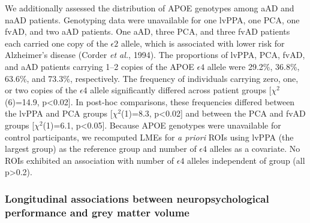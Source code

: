 \documentclass[]{article}
\begin{document}
We additionally assessed the distribution of APOE genotypes among aAD
and naAD patients. Genotyping data were unavailable for one lvPPA, one
PCA, one fvAD, and two aAD patients. One aAD, three PCA, and three fvAD
patients each carried one copy of the \(\epsilon2\) allele, which is
associated with lower risk for Alzheimer's disease (Corder \emph{et
al.}, 1994). The proportions of lvPPA, PCA, fvAD, and aAD patients
carrying 1--2 copies of the APOE \(\epsilon4\) allele were 29.2\%,
36.8\%, 63.6\%, and 73.3\%, respectively. The frequency of individuals
carrying zero, one, or two copies of the \(\epsilon4\) allele
significantly differed across patient groups {[}\(\chi^2\)(6)=14.9,
p\textless{}0.02{]}. In post-hoc comparisons, these frequencies differed
between the lvPPA and PCA groups {[}\(\chi^2\)(1)=8.3,
p\textless{}0.02{]} and between the PCA and fvAD groups
{[}\(\chi^2\)(1)=6.1, p\textless{}0.05{]}. Because APOE genotypes were
unavailable for control participants, we recomputed LMEs for \emph{a
priori} ROIs using lvPPA (the largest group) as the reference group and
number of \(\epsilon4\) alleles as a covariate. No ROIs exhibited an
association with number of \(\epsilon4\) alleles independent of group
(all p\textgreater{}0.2).

\subsubsection*{Longitudinal associations between neuropsychological
performance and grey matter
volume}\label{longitudinal-associations-between-neuropsychological-performance-and-grey-matter-volume}
\end{document}
